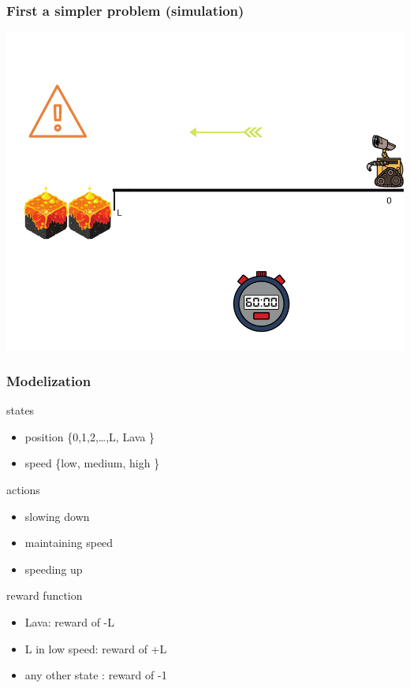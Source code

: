 \documentclass[dvipsnames,svgnames]{beamer}
\begin{document}
\begin{frame}
\frametitle{First a simpler problem (simulation)}
\begin{center}
\includegraphics[scale=0.4]{img/illustration_lava.png}
\end{center}
\end{frame}

\begin{frame}
\frametitle{Modelization}
\begin{block}{states}
\begin{itemize}
\item  position \{0,1,2,\ldots ,L, Lava  \}
\item  speed    \{low, medium, high   \}
\end{itemize}
\end{block}
\pause
\begin{block}{actions}
\begin{itemize}
\item  slowing down
\item  maintaining speed
\item  speeding up 
\end{itemize}
\end{block}
\pause
\begin{block}{reward function}
\begin{itemize}
\item Lava: reward of -L
\item L in low speed: reward of +L
\item any other state : reward of -1
\end{itemize}
\end{block}

\end{frame}
\end{document}
